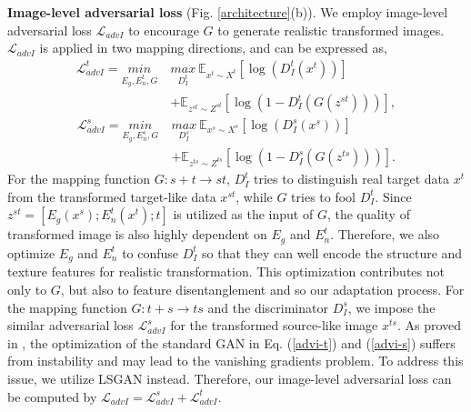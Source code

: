 \documentclass[10pt,journal,compsoc,twocolumn ]{IEEEtran}
\begin{document}
\textbf{Image-level adversarial loss} (Fig. \ref{architecture}(b)). %
We employ image-level adversarial loss $\mathcal{L}_{advI} $ to encourage $G$  to generate realistic transformed images. $\mathcal{L}_{advI} $ is applied in two mapping directions, and can be expressed as,
\begin{equation}
\begin{split}
\mathcal{L}^t_{advI}=\underset{E_g,E^t_n,G}{min}\ & \underset{D^t_I}{max}\ \mathbb{E}_{x^t\sim X^t}\left [ \log\left ( D^t_{I}\left ( x^t \right ) \right )  \right ]\\
&+\mathbb{E}_{z^{st}\sim Z^{st}}\left [ \log \left ( 1-D^t_I\left ( G\left (  z^{st}\right ) \right ) \right ) \right ], \label{advi-t}
\end{split}
\end{equation}
\begin{equation}
\begin{split}
\mathcal{L}^s_{advI}=\underset{E_g,E^s_n,G}{min}\ & \underset{D^s_I}{max}\ \mathbb{E}_{x^s\sim X^s}\left [ \log\left ( D^s_{I}\left ( x^s \right ) \right )  \right ]\\
&+\mathbb{E}_{z^{ts}\sim Z^{ts}}\left [ \log \left ( 1-D^s_I\left ( G\left (  z^{ts}\right ) \right ) \right ) \right ]. \label{advi-s}
\end{split}
\end{equation}
For the mapping function $G:s+t\rightarrow st$, $D^t_I$ tries to distinguish real target data $x^t$ from the transformed target-like data $x^{st}$, while $G$ tries to fool $D^t_I$. Since $z^{st}=[E_g(x^s); E_n^t(x^t); t]$ is utilized as the input of $G$, the quality of transformed image is also highly dependent on $E_g$ and $E_n^t$. %
Therefore, we also optimize $E_g$ and $E_n^t$ to confuse $D^t_I$ so that they can well encode the structure and texture features for realistic transformation. This optimization contributes not only to $G$, but also to feature disentanglement and so our adaptation process. %
For the mapping function $G:t+s\rightarrow ts$ and the discriminator $D^s_I$, we impose the similar adversarial loss $ \mathcal{L}_{advI}^{s}$ for the transformed source-like image $x^{ts}$.
As proved in \cite{mao2017least}, the optimization of the standard GAN in Eq. (\ref{advi-t}) and (\ref{advi-s}) suffers from instability and may lead to the vanishing gradients problem. To address this issue, we utilize LSGAN \cite{mao2017least} instead. Therefore, our image-level adversarial loss can be computed by $\mathcal{L}_{advI} = \mathcal{L}_{advI}^s + \mathcal{L}_{advI}^{t}$.
\end{document}
